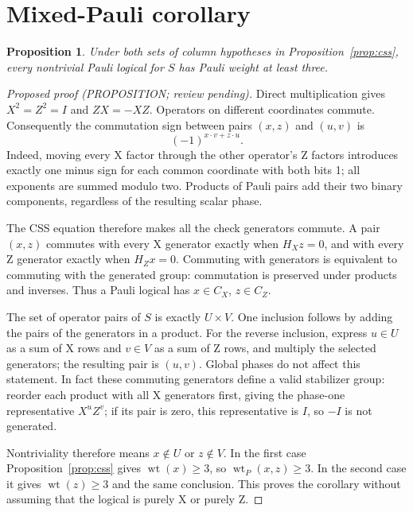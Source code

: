 \documentclass{article}
\newtheorem{proposition}{Proposition}
\DeclareMathOperator{\wt}{wt}
\begin{document}
\section{Mixed-Pauli corollary}\label{sec:pauli}

\begin{proposition}\label{prop:pauli}
Under both sets of column hypotheses in Proposition~\ref{prop:css}, every nontrivial Pauli
logical for \(S\) has Pauli weight at least three.
\end{proposition}

\begin{proof}[Proposed proof (PROPOSITION; review pending)]
  Direct multiplication gives \(X^2 = Z^2 = I\) and \(ZX = -XZ\). Operators on different
  coordinates commute. Consequently the commutation sign between pairs \((x, z)\) and
  \((u, v)\) is
  \begin{equation}
    (-1)^{x \cdot v + z \cdot u}.
  \end{equation}
  Indeed, moving every X factor through the other operator's Z factors introduces exactly
  one minus sign for each common coordinate with both bits 1; all exponents are summed
  modulo two. Products of Pauli pairs add their two binary components, regardless of the
  resulting scalar phase.

  The CSS equation therefore makes all the check generators commute. A pair \((x, z)\)
  commutes with every X generator exactly when \(H_X z = 0\), and with every Z generator
  exactly when \(H_Z x = 0\). Commuting with generators is equivalent to commuting with the
  generated group: commutation is preserved under products and inverses. Thus a Pauli
  logical has \(x \in C_X\), \(z \in C_Z\).

  The set of operator pairs of \(S\) is exactly \(U \times V\). One inclusion follows by
  adding the pairs of the generators in a product. For the reverse inclusion, express
  \(u \in U\) as a sum of X rows and \(v \in V\) as a sum of Z rows, and multiply the
  selected generators; the resulting pair is \((u, v)\). Global phases do not affect this
  statement. In fact these commuting generators define a valid stabilizer group: reorder
  each product with all X generators first, giving the phase-one representative
  \(X^u Z^v\); if its pair is zero, this representative is \(I\), so \(-I\) is not
  generated.

  Nontriviality therefore means \(x \notin U\) or \(z \notin V\). In the first case
  Proposition~\ref{prop:css} gives \(\wt(x) \ge 3\), so \(\wt_P(x, z) \ge 3\). In the second
  case it gives \(\wt(z) \ge 3\) and the same conclusion. This proves the corollary without
  assuming that the logical is purely X or purely Z.
\end{proof}
\end{document}
